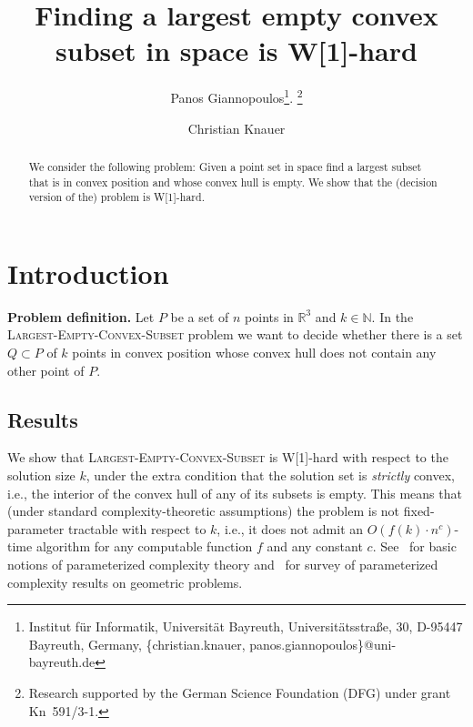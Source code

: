 \documentclass[11pt,a4paper]{article}
\begin{document}
\title{Finding a largest empty convex subset in space is W[1]-hard}

\author{Panos Giannopoulos\thanks{Institut f{\"u}r Informatik, Universit{\"a}t Bayreuth, 
			  \allowbreak Universi\-t{\"a}tsstra{\ss}e, 30, D-95447 Bayreuth, Germany,
			  \textsf \{christian.knauer, panos.giannopoulos\}@uni-bayreuth.de}.
\footnote{Research supported by the German Science Foundation (DFG) under grant Kn~591/3-1.}
\and
Christian Knauer\footnotemark[1]
}



\maketitle

\begin{abstract}
We consider the following problem: Given a point set in space find a largest subset that is in convex position and whose convex hull is empty. We show that the (decision version of the) problem is W[1]-hard.
\end{abstract}




\section{Introduction}
\label{sec:introduction}

\noindent
{\textbf {Problem definition.}} Let $P$ be a set of $n$ points in $\mathbb{R}^3$ and $k\in \mathbb{N}$. In the \textsc{Largest-Empty-Convex-Subset} problem we want to decide whether there is a set $Q\subset P$ of $k$ points in convex position whose convex hull does not contain any other point of $P$.  

\subsection{Results}

We show that \textsc{Largest-Empty-Convex-Subset} is W[1]-hard with respect to the solution size $k$, under the extra condition that the solution set is \emph{strictly} convex, i.e., the interior of the convex hull of any of its subsets is empty. This means that (under standard complexity-theoretic assumptions) the problem is not fixed-parameter tractable with respect to $k$, i.e., it does not admit an $O(f(k)\cdot n^c)$-time algorithm for any computable function $f$ and any constant $c$. See~\cite{FG06} for basic notions of parameterized complexity theory and~\cite{GKW08}  for survey of parameterized complexity results on geometric problems.
\end{document}
